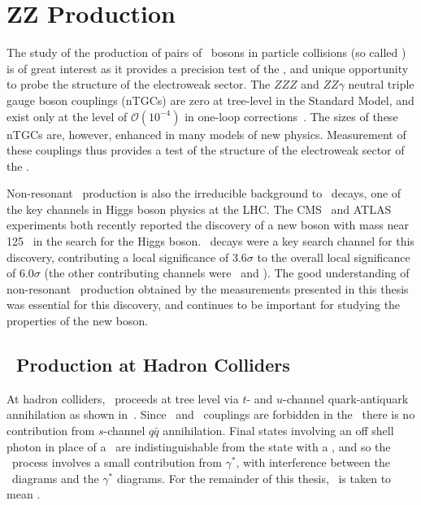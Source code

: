 \graphicspath{{Chapters/TheoryZZProduction/Figures/}}
\chapter{ZZ Production}
\label{chap:TheoryZZProduction}


The study of the production of pairs of \Z\ bosons in particle collisions (so
called ) is of great interest as it provides a
precision test of the \sm, and unique opportunity to probe the structure of the
electroweak sector.  The $ZZZ$ and $ZZ\gamma$ neutral triple gauge boson
couplings (nTGCs) are zero at tree-level in the Standard Model, and exist only
at the level of  $\mathcal{O}(10^{-4})$ in one-loop
corrections~\cite{Gounaris:2000dn}. The sizes of these nTGCs are, however,
enhanced in many models of new physics. Measurement of these couplings thus
provides a test of the structure of the electroweak sector of the \sm.

Non-resonant \ZZ\ production is also the irreducible background to \HZZ\ decays,
one of the key channels in Higgs boson physics at the LHC. The
CMS~\cite{CMS_Higgs:2012gu} and ATLAS~\cite{ATLAS_Higgs:2012gk} experiments both
recently reported the discovery of a new boson with mass near 125 \gev\ in the
search for the Higgs boson. \HZZ\ decays were a key search channel for this
discovery, contributing a local significance of 3.6$\sigma$ to the overall
local significance of 6.0$\sigma$ (the other contributing channels were \Hgg\
and \HWW). The good understanding of non-resonant \ZZ\ production obtained by
the measurements presented in this thesis was essential for this
discovery, and continues to be important for studying the properties of the new
boson.

\section{\ZZ\ Production at Hadron Colliders}

At hadron colliders, \qqZZ\ proceeds at tree level via $t$- and $u$-channel
quark-antiquark annihilation as shown in~\fig{theoryzz-fd-qqZZ}. Since \ZZZ\ and
\ZZg\ couplings are forbidden in the \sm\ there is no contribution from
$s$-channel $q\bar{q}$ annihilation. Final states involving an off shell photon
in place of a \Z\ are indistinguishable from the state with a \Z, and so the
\qqZZ\ process involves a small contribution from $\gamma^{*}$, with
interference between the \Z\ diagrams and the $\gamma^{*}$ diagrams. For the
remainder of this thesis, \Z\ is taken to mean \Zorgv.

